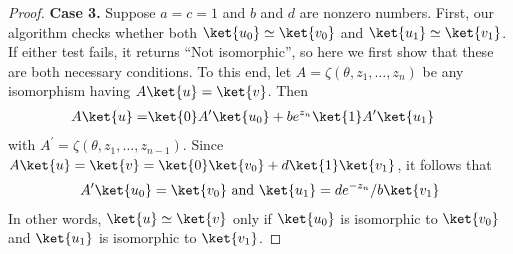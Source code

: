 \begin{proof}
	\textbf{Case 3. } Suppose $a=c=1$ and $b$ and $d$ are nonzero numbers.
	First, our algorithm checks whether both $\ket{u_0}\simeq \ket{v_0}$ and $\ket{u_1}\simeq\ket{v_1}$.
	If either test fails, it returns ``Not isomorphic'', so here we first show that these are both necessary conditions.
	To this end, let $A=\zeta(\theta,z_1,\ldots, z_n)$ be any isomorphism having $A\ket{u}=\ket{v}$. Then
	\begin{align}
		A\ket{u}= &\ket{0}A^\prime\ket{u_0} + be^{z_n}\ket{1}A^\prime\ket{u_1}
	\end{align}
	with $A^\prime=\zeta(\theta,z_1,\ldots,z_{n-1})$. Since $A\ket{u}=\ket{v}=\ket{0}\ket{v_0}+d\ket{1}\ket{v_1}$, it follows that
	\begin{align}
		A^\prime\ket{u_0}=\ket{v_0}\text{ and }\ket{u_1}=de^{-z_n}/b\ket{v_1}
	\end{align}
	In other words, $\ket{u}\simeq\ket{v}$ only if $\ket{u_0}$ is isomorphic to $\ket{v_0}$ and $\ket{u_1}$ is isomorphic to $\ket{v_1}$.
	

\end{proof}
